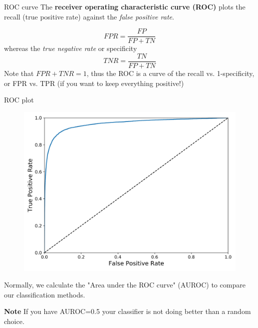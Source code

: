 \documentclass{beamer}
\begin{document}
\begin{frame}{ROC curve}
	The {\bf receiver operating characteristic curve (ROC)} plots the recall (true positive rate) against the {\it false positive rate}. 
	
	\begin{equation*}
		FPR= \frac{FP}{FP+TN}
	\end{equation*}
whereas the {\it true negative rate} or specificity 
\begin{equation*}
	TNR= \frac{TN}{FP+TN}
\end{equation*}
	Note that $FPR+TNR=1$, thus the ROC is a curve of the recall vs. 1-specificity, or FPR vs. TPR (if you want to keep everything positive!)
\end{frame}
\begin{frame}{ROC plot}
\begin{figure}
	\centering
	\includegraphics[scale=0.35]{../../Figures/roc_curve_plot.png}
\end{figure}
Normally, we calculate the "Area under the ROC curve" (AUROC) to compare our classification methods.

{\bf Note} If you have AUROC=0.5 your classifier is not doing better than a random choice.
\end{frame}
\end{document}
